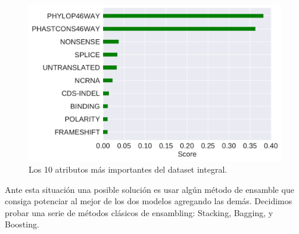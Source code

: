 \begin{figure}[H]
    \centering
    \includegraphics[scale=0.55]{documents/latex/figures/3/importances_integral.pdf}
    \caption{Los 10 atributos más importantes del dataset integral.}
    \label{fig:importances_integral}
\end{figure}

Ante esta situación una posible solución es usar algún método de ensamble que consiga potenciar al mejor de los dos modelos agregando las demás. Decidimos probar una serie de métodos clásicos de ensambling: Stacking, Bagging, y Boosting.






